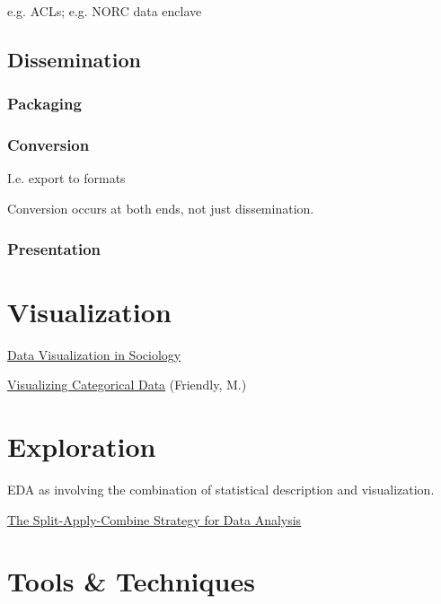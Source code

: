 \documentclass[reqno,12pt]{tufte-book}
\numberwithin{equation}{subsection}
\begin{document}
e.g. ACLs; e.g. NORC data enclave

\chapter{Dissemination}

\section{Packaging}
\label{sect:datapkg}

\section{Conversion}
\label{sect:conversion}

I.e. export to formats

Conversion occurs at both ends, not just dissemination.

\section{Presentation}
\label{sect:datapresentation}

\part{Visualization}

\href {http://kieranhealy.org/files/papers/data-visualization.pdf}{Data Visualization in Sociology}

\href{http://www.datavis.ca/books/vcd/}{Visualizing Categorical Data} (Friendly, M.)

\part{Exploration}
\label{part:eda}

EDA as involving the combination of statistical description and visualization.

\href{http://www.jstatsoft.org/v40/i01}{The Split-Apply-Combine Strategy for Data Analysis}

\part{Tools \& Techniques}
\end{document}
